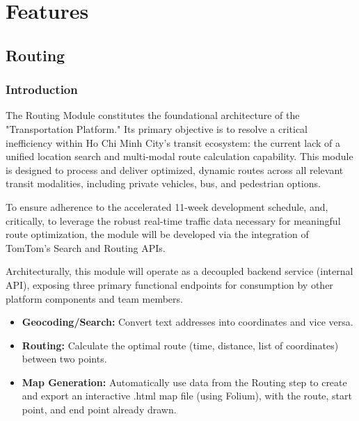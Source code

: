 \chapter{Features}
\label{chap:features}

\section{Routing}
\subsection{Introduction}
The Routing Module constitutes the foundational architecture of the "Transportation Platform." Its primary objective is to resolve a critical inefficiency within Ho Chi Minh City's transit ecosystem: the current lack of a unified location search and multi-modal route calculation capability. 
This module is designed to process and deliver optimized, dynamic routes across all relevant transit modalities, including private vehicles, bus, and pedestrian options.

To ensure adherence to the accelerated 11-week development schedule, and, critically, to leverage the robust real-time traffic data necessary for meaningful route optimization, the module will be developed via the integration of TomTom's Search and Routing APIs. 

Architecturally, this module will operate as a decoupled backend service (internal API), exposing three primary functional endpoints for consumption by other platform components and team members.
\begin{itemize}
  \item \textbf{Geocoding/Search:} Convert text addresses into coordinates and vice versa.
  \item \textbf{Routing:} Calculate the optimal route (time, distance, list of coordinates) between two points.
  \item \textbf{Map Generation:} Automatically use data from the Routing step to create and export an interactive .html map file (using Folium), with the route, start point, and end point already drawn.
\end{itemize}

